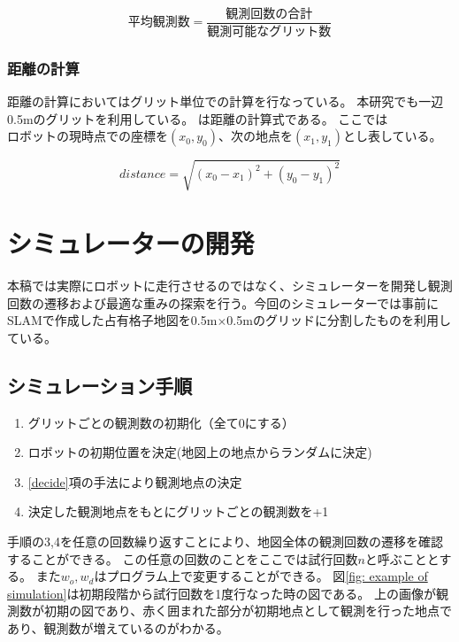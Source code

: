 \documentclass{jsarticle}
\begin{document}
\begin{equation}
  平均観測数 = \frac{観測回数の合計}{観測可能なグリット数}
	\label{eqn: observation}
\end{equation}

\subsubsection{距離の計算}
距離の計算においてはグリット単位での計算を行なっている。
本研究でも一辺0.5mのグリットを利用している。
は距離の計算式である。
ここでは$ロボットの現時点での座標を(x_0, y_0)、次の地点を(x_1,y_1)$とし表している。


\begin{equation}
  distance = \sqrt{(x_0-x_1)^2 + (y_0-y_1)^2}
	\label{eqn: distance}
\end{equation}



\section{シミュレーターの開発}
\label{simulation}
本稿では実際にロボットに走行させるのではなく、シミュレーターを開発し観測回数の遷移および最適な重みの探索を行う。今回のシミュレーターでは事前にSLAMで作成した占有格子地図を0.5m$\times$0.5mのグリッドに分割したものを利用している。

\subsection{シミュレーション手順}
\label{process-simulation}
\begin{enumerate}
  \item グリットごとの観測数の初期化（全て0にする）
  \item ロボットの初期位置を決定(地図上の地点からランダムに決定)
  \item \ref{decide}項の手法により観測地点の決定
  \item 決定した観測地点をもとにグリットごとの観測数を+1
\end{enumerate}
手順の3,4を任意の回数繰り返すことにより、地図全体の観測回数の遷移を確認することができる。
この任意の回数のことをここでは試行回数$n$と呼ぶこととする。
また$w_o,w_d$はプログラム上で変更することができる。
図\ref{fig: example of simulation}は初期段階から試行回数を1度行なった時の図である。
上の画像が観測数が初期の図であり、赤く囲まれた部分が初期地点として観測を行った地点であり、観測数が増えているのがわかる。
\end{document}
